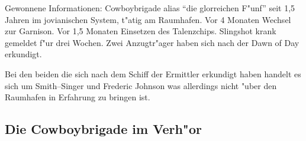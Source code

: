 \begin{remarks}
	Gewonnene Informationen: Cowboybrigade alias "`die glorreichen F"unf"' seit 1,5 Jahren im jovianischen System, t"atig am Raumhafen. Vor 4 Monaten Wechsel zur Garnison. Vor 1,5 Monaten Einsetzen des Talenzchips. Slingshot krank gemeldet f"ur drei Wochen. Zwei Anzugtr"ager haben sich nach der Dawn of Day erkundigt.

	Bei den beiden die sich nach dem Schiff der Ermittler erkundigt haben handelt es sich um Smith--Singer und Frederic Johnson was allerdings nicht "uber den Raumhafen in Erfahrung zu bringen ist.
\end{remarks}


\subsection{Die Cowboybrigade im Verh"or}

